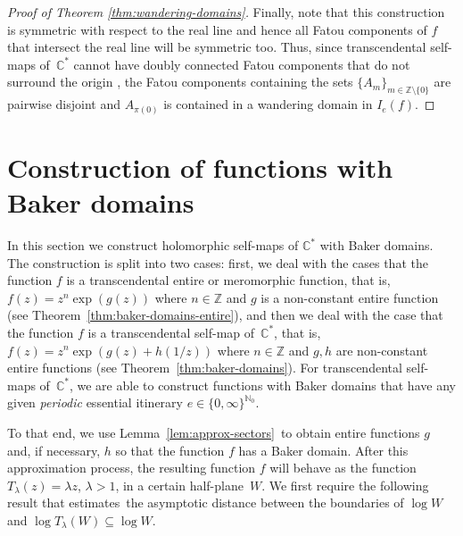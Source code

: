 \documentclass[a4paper, 12pt, reqno]{amsart}
\numberwithin{equation}{section}
\newcommand{\red}[1]{{\color{red} #1}}
\theoremstyle{plain}
\theoremstyle{definition}
\theoremstyle{remark}
\newcommand{\C}{{\mathbb{C}}}
\newcommand{\Z}{{\mathbb{Z}}}
\newcommand{\N}{{\mathbb{N}}}
\begin{document}
\begin{proof}[Proof of Theorem \ref{thm:wandering-domains}]
Finally, note that this construction is symmetric with respect to the real line and hence all Fatou components of $f$ that intersect the real line will be symmetric too. Thus, since transcendental self-maps of~$\C^*$ cannot have doubly connected Fatou components that do not surround the origin \cite[Theorem 1]{baker87}, the Fatou components containing the sets $\{A_m\}_{m\in\Z\setminus \{0\}}$ are pairwise disjoint and $A_{\pi(0)}$ is contained in a wandering domain in $I_e(f)$.
\end{proof}


\section{Construction of functions with Baker domains}

\label{sec:bd}



In this section we construct holomorphic self-maps of $\C^*$ with Baker domains. The construction is split into two cases: first, we deal with the cases that the function $f$ is a transcendental entire or meromorphic function, that is, $f(z)=z^n\exp(g(z))$ where $n\in\Z$ and $g$ is a non-constant entire function (see Theorem~\ref{thm:baker-domains-entire}), and then we deal with the case that the function $f$ is a transcendental self-map of~$\C^*$, that is, $f(z)=z^n\exp(g(z)+h(1/z))$ where $n\in \Z$ and $g,h$ are non-constant entire functions (see Theorem~\ref{thm:baker-domains}). For transcendental self-maps of~$\C^*$, we are able to construct functions with Baker domains that have any given \textit{periodic} essential itinerary $e\in\{0,\infty\}^{\N_0}$. 

To that end, we use Lemma~\ref{lem:approx-sectors}~to obtain entire functions $g$ and, if necessary, $h$ so that the function $f$ has a Baker domain. After this approximation process, the resulting function $f$ will behave as the function~$T_\lambda(z)=\lambda z$, $\lambda>1$, in a certain half-plane~$W$. We first require the following result that estimates~the asymptotic distance between the boundaries of $\log W$ and $\log T_\lambda(W)\subseteq \log W$.
\end{document}
